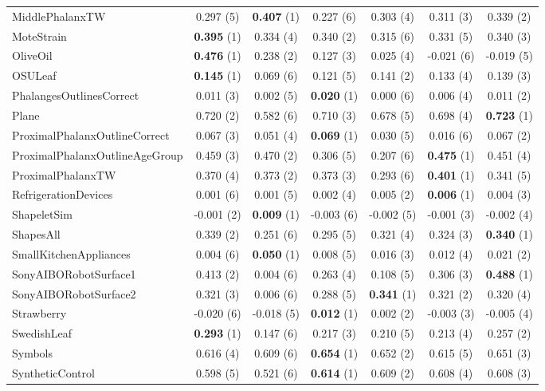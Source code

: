 \begin{table}[ht]
\begin{adjustbox}{width=\textwidth}
\begin{tabular}{lcccccc}
MiddlePhalanxTW & 0.297 (5) & \textbf{0.407} (1) & 0.227 (6) & 0.303 (4) & 0.311 (3) & 0.339 (2) \\
MoteStrain & \textbf{0.395} (1) & 0.334 (4) & 0.340 (2) & 0.315 (6) & 0.331 (5) & 0.340 (3) \\
OliveOil & \textbf{0.476} (1) & 0.238 (2) & 0.127 (3) & 0.025 (4) & -0.021 (6) & -0.019 (5) \\
OSULeaf & \textbf{0.145} (1) & 0.069 (6) & 0.121 (5) & 0.141 (2) & 0.133 (4) & 0.139 (3) \\
PhalangesOutlinesCorrect & 0.011 (3) & 0.002 (5) & \textbf{0.020} (1) & 0.000 (6) & 0.006 (4) & 0.011 (2) \\
Plane & 0.720 (2) & 0.582 (6) & 0.710 (3) & 0.678 (5) & 0.698 (4) & \textbf{0.723} (1) \\
ProximalPhalanxOutlineCorrect & 0.067 (3) & 0.051 (4) & \textbf{0.069} (1) & 0.030 (5) & 0.016 (6) & 0.067 (2) \\
ProximalPhalanxOutlineAgeGroup & 0.459 (3) & 0.470 (2) & 0.306 (5) & 0.207 (6) & \textbf{0.475} (1) & 0.451 (4) \\
ProximalPhalanxTW & 0.370 (4) & 0.373 (2) & 0.373 (3) & 0.293 (6) & \textbf{0.401} (1) & 0.341 (5) \\
RefrigerationDevices & 0.001 (6) & 0.001 (5) & 0.002 (4) & 0.005 (2) & \textbf{0.006} (1) & 0.004 (3) \\
ShapeletSim & -0.001 (2) & \textbf{0.009} (1) & -0.003 (6) & -0.002 (5) & -0.001 (3) & -0.002 (4) \\
ShapesAll & 0.339 (2) & 0.251 (6) & 0.295 (5) & 0.321 (4) & 0.324 (3) & \textbf{0.340} (1) \\
SmallKitchenAppliances & 0.004 (6) & \textbf{0.050} (1) & 0.008 (5) & 0.016 (3) & 0.012 (4) & 0.021 (2) \\
SonyAIBORobotSurface1 & 0.413 (2) & 0.004 (6) & 0.263 (4) & 0.108 (5) & 0.306 (3) & \textbf{0.488} (1) \\
SonyAIBORobotSurface2 & 0.321 (3) & 0.006 (6) & 0.288 (5) & \textbf{0.341} (1) & 0.321 (2) & 0.320 (4) \\
Strawberry & -0.020 (6) & -0.018 (5) & \textbf{0.012} (1) & 0.002 (2) & -0.003 (3) & -0.005 (4) \\
SwedishLeaf & \textbf{0.293} (1) & 0.147 (6) & 0.217 (3) & 0.210 (5) & 0.213 (4) & 0.257 (2) \\
Symbols & 0.616 (4) & 0.609 (6) & \textbf{0.654} (1) & 0.652 (2) & 0.615 (5) & 0.651 (3) \\
SyntheticControl & 0.598 (5) & 0.521 (6) & \textbf{0.614} (1) & 0.609 (2) & 0.608 (4) & 0.608 (3) \\

\end{tabular}
\end{adjustbox}
\end{table}

